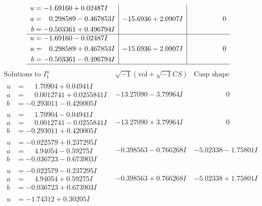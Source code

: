 \documentclass[1p]{elsarticle_modified}
\theoremstyle{definition}
\newcommand{\I}{\sqrt{-1}}
\begin{document}
$$\begin{array}{c|c|c}
\begin{aligned}
u &= -1.69160 + 0.02487 I \\
a &= \phantom{-}0.298589 - 0.467853 I \\
b &= -0.503361 + 0.496794 I\end{aligned}
 & -15.6936 + 2.0907 I & \phantom{-0.000000 } 0 \\ \hline\begin{aligned}
u &= -1.69160 - 0.02487 I \\
a &= \phantom{-}0.298589 + 0.467853 I \\
b &= -0.503361 - 0.496794 I\end{aligned}
 & -15.6936 - 2.0907 I & \phantom{-0.000000 } 0\\
 \hline 
 \end{array}$$\newpage$$\begin{array}{c|c|c}  
\text{Solutions to }I^u_{1}& \I (\text{vol} + \sqrt{-1}CS) & \text{Cusp shape}\\
 \hline 
\begin{aligned}
u &= \phantom{-}1.70904 + 0.04941 I \\
a &= \phantom{-}0.0012741 + 0.0255841 I \\
b &= -0.293011 - 0.420005 I\end{aligned}
 & -13.27090 - 3.79964 I & \phantom{-0.000000 } 0 \\ \hline\begin{aligned}
u &= \phantom{-}1.70904 - 0.04941 I \\
a &= \phantom{-}0.0012741 - 0.0255841 I \\
b &= -0.293011 + 0.420005 I\end{aligned}
 & -13.27090 + 3.79964 I & \phantom{-0.000000 } 0 \\ \hline\begin{aligned}
u &= -0.022579 + 0.237295 I \\
a &= \phantom{-}4.94054 - 0.59275 I \\
b &= -0.036723 - 0.673903 I\end{aligned}
 & -0.398563 - 0.766268 I & -5.02338 - 1.75801 I \\ \hline\begin{aligned}
u &= -0.022579 - 0.237295 I \\
a &= \phantom{-}4.94054 + 0.59275 I \\
b &= -0.036723 + 0.673903 I\end{aligned}
 & -0.398563 + 0.766268 I & -5.02338 + 1.75801 I \\ \hline\begin{aligned}
u &= -1.74312 + 0.30205 I \\

\end{aligned}
\end{array}$$
\end{document}
